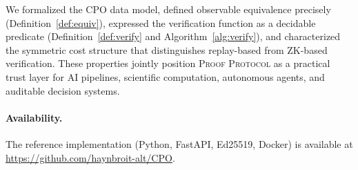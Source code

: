 \documentclass[11pt]{article}
\begin{document}
We formalized the CPO data model, defined observable equivalence precisely
(Definition~\ref{def:equiv}), expressed the verification function as a
decidable predicate (Definition~\ref{def:verify} and
Algorithm~\ref{alg:verify}), and characterized the symmetric cost structure
that distinguishes replay-based from ZK-based verification.  These
properties jointly position \textsc{Proof Protocol} as a practical trust
layer for AI pipelines, scientific computation, autonomous agents, and
auditable decision systems.

\paragraph{Availability.}
The reference implementation (Python, FastAPI, Ed25519, Docker) is
available at \url{https://github.com/haynbroit-alt/CPO}.
\end{document}

